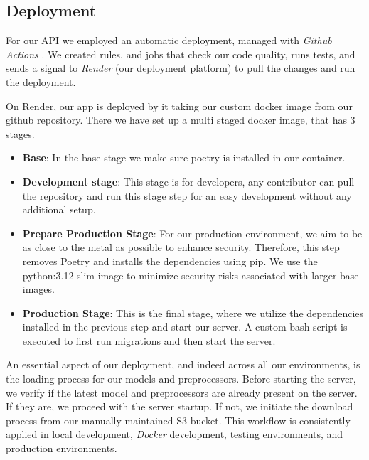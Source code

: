 \subsection{Deployment}
For our API we employed an automatic deployment, managed with \textit{Github Actions} \cite{github_actions}. We created rules, and jobs that check our code quality, runs tests, and sends a signal to \textit{Render} \cite{render} (our deployment platform) to pull the changes and run the deployment.

On Render, our app is deployed by it taking our custom docker image from our github repository. There we have set up a multi staged docker image, that has 3 stages.

\begin{itemize}
    \item \textbf{Base}: In the base stage we make sure poetry is installed in our container.
    \item \textbf{Development stage}: This stage is for developers, any contributor can pull the repository and run this stage step for an easy development without any additional setup.
    \item \textbf{Prepare Production Stage}: For our production environment, we aim to be as close to the metal as possible to enhance security. Therefore, this step removes Poetry and installs the dependencies using pip. We use the python:3.12-slim image to minimize security risks associated with larger base images.
    \item \textbf{Production Stage}: This is the final stage, where we utilize the dependencies installed in the previous step and start our server. A custom bash script is executed to first run migrations and then start the server.
\end{itemize}

An essential aspect of our deployment, and indeed across all our environments, is the loading process for our models and preprocessors. Before starting the server, we verify if the latest model and preprocessors are already present on the server. If they are, we proceed with the server startup. If not, we initiate the download process from our manually maintained S3 bucket. This workflow is consistently applied in local development, \textit{Docker} \cite{docker} development, testing environments, and production environments.


